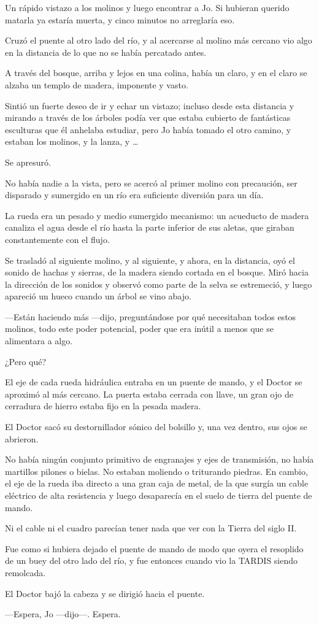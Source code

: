 Un rápido vistazo a los molinos y luego encontrar a Jo. Si hubieran
querido matarla ya estaría muerta, y cinco minutos no arreglaría eso.

Cruzó el puente al otro lado del río, y al acercarse al molino más
cercano vio algo en la distancia de lo que no se había percatado antes.

A través del bosque, arriba y lejos en una colina, había un claro, y en
el claro se alzaba un templo de madera, imponente y vasto.

Sintió un fuerte deseo de ir y echar un vistazo; incluso desde esta
distancia y mirando a través de los árboles podía ver que estaba
cubierto de fantásticas esculturas que él anhelaba estudiar, pero Jo
había tomado el otro camino, y estaban los molinos, y la lanza, y
\ldots{}

Se apresuró.

No había nadie a la vista, pero se acercó al primer molino con
precaución, ser disparado y sumergido en un río era suficiente diversión
para un día.

La rueda era un pesado y medio sumergido mecanismo: un acueducto de
madera canaliza el agua desde el río hasta la parte inferior de sus
aletas, que giraban constantemente con el flujo.

Se trasladó al siguiente molino, y al siguiente, y ahora, en la
distancia, oyó el sonido de hachas y sierras, de la madera siendo
cortada en el bosque. Miró hacia la dirección de los sonidos y observó
como parte de la selva se estremeció, y luego apareció un hueco cuando
un árbol se vino abajo.

---Están haciendo más ---dijo, preguntándose por qué necesitaban todos
estos molinos, todo este poder potencial, poder que era inútil a menos
que se alimentara a algo.

¿Pero qué?

El eje de cada rueda hidráulica entraba en un puente de mando, y el
Doctor se aproximó al más cercano. La puerta estaba cerrada con llave,
un gran ojo de cerradura de hierro estaba fijo en la pesada madera.

El Doctor sacó su destornillador sónico del bolsillo y, una vez dentro,
sus ojos se abrieron.

No había ningún conjunto primitivo de engranajes y ejes de transmisión,
no había martillos pilones o bielas. No estaban moliendo o triturando
piedras. En cambio, el eje de la rueda iba directo a una gran caja de
metal, de la que surgía un cable eléctrico de alta resistencia y luego
desaparecía en el suelo de tierra del puente de mando.

Ni el cable ni el cuadro parecían tener nada que ver con la Tierra del
siglo II.

Fue como si hubiera dejado el puente de mando de modo que oyera el
resoplido de un buey del otro lado del río, y fue entonces cuando vio la
TARDIS siendo remolcada.

El Doctor bajó la cabeza y se dirigió hacia el puente.

---Espera, Jo ---dijo---. Espera.